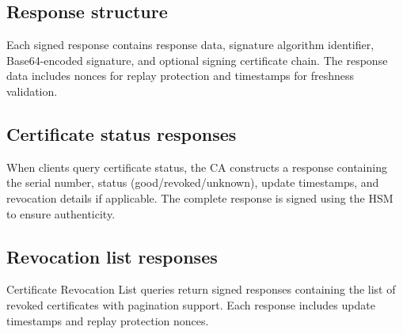 \subsection{Response structure}
Each signed response contains response data, 
signature algorithm identifier, Base64-encoded signature, and optional signing 
certificate chain. The response data includes nonces for replay protection 
and timestamps for freshness validation.

\subsection{Certificate status responses}
When clients query certificate status, 
the CA constructs a response containing the serial number, status (good/revoked/unknown), 
update timestamps, and revocation details if applicable. The complete response 
is signed using the HSM to ensure authenticity.

\subsection{Revocation list responses}
Certificate Revocation List queries return 
signed responses containing the list of revoked certificates with pagination 
support. Each response includes update timestamps and replay protection nonces.






